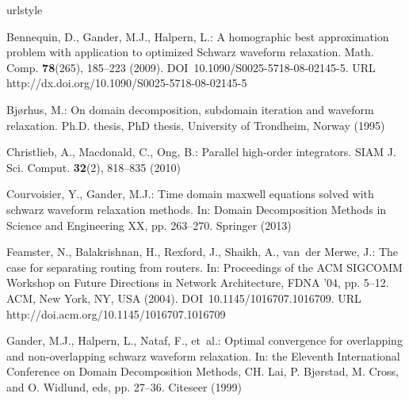 \documentclass{svmult-ddm}
\begin{document}

\begin{thebibliography}{10}
\providecommand{\url}[1]{{#1}}
\providecommand{\urlprefix}{URL }
\expandafter\ifx\csname urlstyle\endcsname\relax
  \providecommand{\doi}[1]{DOI~\discretionary{}{}{}#1}\else
  \providecommand{\doi}{DOI~\discretionary{}{}{}\begingroup
  \urlstyle{rm}\Url}\fi

Bennequin, D., Gander, M.J., Halpern, L.: A homographic best approximation
  problem with application to optimized {S}chwarz waveform relaxation.
\newblock Math. Comp. \textbf{78}(265), 185--223 (2009).
\newblock \doi{10.1090/S0025-5718-08-02145-5}.
\newblock \urlprefix\url{http://dx.doi.org/10.1090/S0025-5718-08-02145-5}

Bj{\o}rhus, M.: On domain decomposition, subdomain iteration and waveform
  relaxation.
\newblock Ph.D. thesis, PhD thesis, University of Trondheim, Norway (1995)

Christlieb, A., Macdonald, C., Ong, B.: Parallel high-order integrators.
\newblock SIAM J. Sci. Comput. \textbf{32}(2), 818--835 (2010)

Courvoisier, Y., Gander, M.J.: Time domain maxwell equations solved with
  schwarz waveform relaxation methods.
\newblock In: Domain Decomposition Methods in Science and Engineering XX, pp.
  263--270. Springer (2013)

Feamster, N., Balakrishnan, H., Rexford, J., Shaikh, A., van~der Merwe, J.: The
  case for separating routing from routers.
\newblock In: Proceedings of the ACM SIGCOMM Workshop on Future Directions in
  Network Architecture, FDNA '04, pp. 5--12. ACM, New York, NY, USA (2004).
\newblock \doi{10.1145/1016707.1016709}.
\newblock \urlprefix\url{http://doi.acm.org/10.1145/1016707.1016709}

Gander, M.J., Halpern, L., Nataf, F., et~al.: Optimal convergence for
  overlapping and non-overlapping schwarz waveform relaxation.
\newblock In: the Eleventh International Conference on Domain Decomposition
  Methods, CH. Lai, P. Bj{\o}rstad, M. Cross, and O. Widlund, eds, pp. 27--36.
  Citeseer (1999)


\end{thebibliography}
\end{document}
